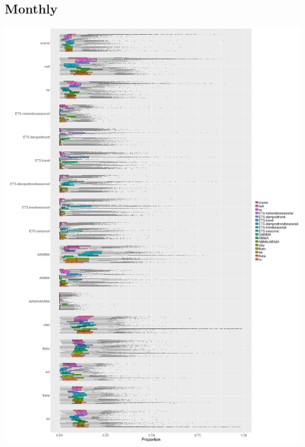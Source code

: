 \documentclass[11pt,a4paper,]{article}
\begin{document}
\subsection{Monthly}\label{monthly}

\includegraphics{figures/oobmonthly-1.png}
\end{document}
